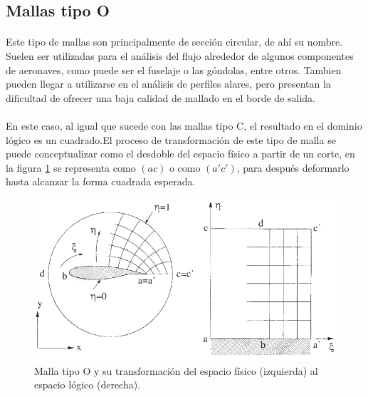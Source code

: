 \documentclass[letterpaper, openright, 12pt]{book}
\begin{document}
    \subsection{Mallas tipo O}
    \paragraph*{}
        Este tipo de mallas son principalmente de sección circular, de ahí su
        nombre. Suelen ser utilizadas para el análisis del flujo alrededor de
        algunos componentes de aeronaves, como puede ser el fuselaje o las
        góndolas, entre otros.\cite{vladimir-grid} Tambien pueden llegar a
        utilizarse en el análisis de perfiles alares, pero presentan la
        dificultad de ofrecer una baja calidad de mallado en el borde de salida.\cite{blazek}\cite{best-practices-grid-generation}
    \paragraph*{}
        En este caso, al igual que sucede con las mallas tipo C, el resultado en
        el dominio lógico es un cuadrado.El proceso de transformación de este
        tipo de malla se puede conceptualizar como el desdoble del espacio
        físico a partir de un corte, en la figura \ref{fig:malla-o} se
        representa como $(ac)$ o como $(a'c')$, para después deformarlo hasta
        alcanzar la forma cuadrada esperada.
            \begin{figure}[htbp!]
                \centering
                    \includegraphics[keepaspectratio, width=170mm]{./Imagenes/malla-o}
                    \captionsetup{justification=centering, margin=2cm}
                    \caption[Malla tipo O]{Malla tipo O y su transformación del
                    espacio físico (izquierda) al espacio lógico (derecha).\cite{blazek}}
                \label{fig:malla-o}
            \end{figure}
\end{document}
